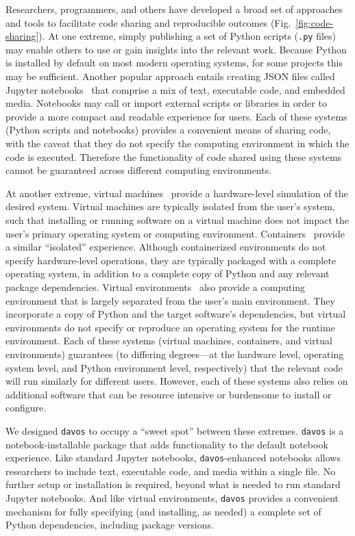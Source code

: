 \documentclass[preprint,12pt,a4paper]{elsarticle}
\begin{document}
Researchers, programmers, and others have developed a broad
set of approaches and tools to facilitate code sharing and
reproducible outcomes (Fig.~\ref{fig:code-sharing}). At one
extreme, simply publishing a set of Python scripts (\texttt{.py} files) may
enable others to use or gain insights into the relevant work. Because
Python is installed by default on most modern operating systems, for
some projects this may be sufficient. Another popular approach
entails creating JSON files called Jupyter
notebooks~\cite{KluyEtal16} that comprise a mix of text, executable
code, and embedded media. Notebooks may call or import external
scripts or libraries in order to provide a more compact and readable
experience for users. Each of these systems (Python scripts and
notebooks) provides a convenient means of sharing code, with the
caveat that they do not specify the computing environment in which the
code is executed. Therefore the functionality of code shared using
these systems cannot be guaranteed across different computing
environments.

At another extreme, virtual machines~\cite{Gold74, AltiEtal05,
 Rose99} provide a hardware-level simulation of the desired system.
Virtual machines are typically isolated from the user's system, such
that installing or running software on a virtual machine does not
impact the user's primary operating system or computing environment.
Containers~\cite[e.g.,][]{Merk14, KurtEtal17} provide a similar
``isolated'' experience. Although containerized environments do not
specify hardware-level operations, they are typically packaged with a
complete operating system, in addition to a complete copy of Python
and any relevant package dependencies. Virtual
environments~\cite[e.g.,][]{Anac12} also provide a computing
environment that is largely separated from the user's main
environment. They incorporate a copy of Python and the target
software's dependencies, but virtual environments do not specify or
reproduce an operating system for the runtime environment. Each of
these systems (virtual machines, containers, and virtual environments)
guarantees (to differing degrees---at the hardware level, operating
system level, and Python environment level, respectively) that the
relevant code will run similarly for different users. However, each
of these systems also relies on additional software that can be
resource intensive or burdensome to install or configure.

We designed \texttt{davos} to occupy a ``sweet spot'' between these
extremes.  \texttt{davos} is a notebook-installable package that adds
functionality to the default notebook experience. Like standard
Jupyter notebooks, \texttt{davos}-enhanced notebooks allows
researchers to include text, executable code, and media within a
single file. No further setup or installation is required, beyond
what is needed to run standard Jupyter notebooks. And like virtual
environments, \texttt{davos} provides a convenient mechanism for fully
specifying (and installing, as needed) a complete set of Python
dependencies, including package versions.
\end{document}
